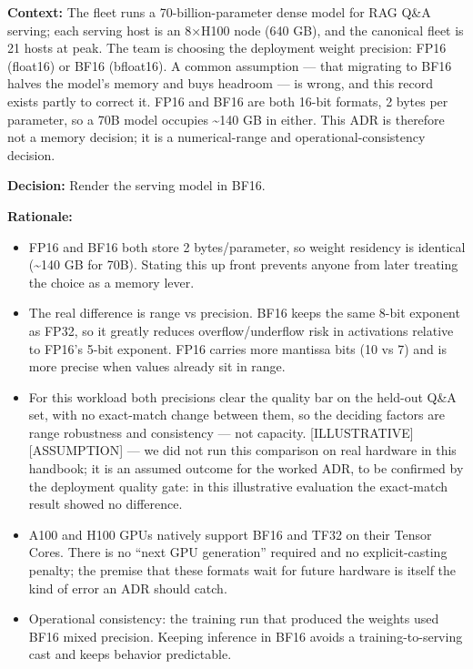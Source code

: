 \textbf{Context:} The fleet runs a 70-billion-parameter dense model for
RAG Q\&A serving; each serving host is an 8×H100 node (640 GB), and the
canonical fleet is 21 hosts at peak. The team is choosing the deployment
weight precision: FP16 (float16) or BF16 (bfloat16). A common assumption
--- that migrating to BF16 halves the model's memory and buys headroom
--- is wrong, and this record exists partly to correct it. FP16 and BF16
are both 16-bit formats, 2 bytes per parameter, so a 70B model occupies
\textasciitilde140 GB in either. This ADR is therefore not a memory
decision; it is a numerical-range and operational-consistency decision.

\textbf{Decision:} Render the serving model in BF16.

\textbf{Rationale:}

\begin{itemize}
\tightlist
\item
  FP16 and BF16 both store 2 bytes/parameter, so weight residency is
  identical (\textasciitilde140 GB for 70B). Stating this up front
  prevents anyone from later treating the choice as a memory lever.
\item
  The real difference is range vs precision. BF16 keeps the same 8-bit
  exponent as FP32, so it greatly reduces overflow/underflow risk in
  activations relative to FP16's 5-bit exponent. FP16 carries more
  mantissa bits (10 vs 7) and is more precise when values already sit in
  range.
\item
  For this workload both precisions clear the quality bar on the
  held-out Q\&A set, with no exact-match change between them, so the
  deciding factors are range robustness and consistency --- not
  capacity. \mbox{{[}ILLUSTRATIVE{]}}\hspace{0pt}\mbox{{[}ASSUMPTION{]}} --- we did not run this
  comparison on real hardware in this handbook; it is an assumed outcome
  for the worked ADR, to be confirmed by the deployment quality gate: in
  this illustrative evaluation the exact-match result showed no
  difference.
\item
  A100 and H100 GPUs natively support BF16 and TF32 on their Tensor
  Cores. There is no ``next GPU generation'' required and no
  explicit-casting penalty; the premise that these formats wait for
  future hardware is itself the kind of error an ADR should catch.
\item
  Operational consistency: the training run that produced the weights
  used BF16 mixed precision. Keeping inference in BF16 avoids a
  training-to-serving cast and keeps behavior predictable.
\end{itemize}

